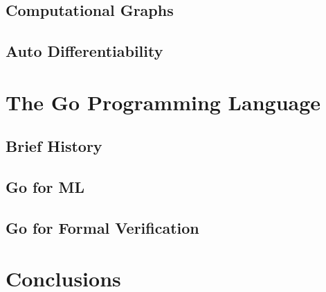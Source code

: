 \subsection{Computational Graphs}
\subsection{Auto Differentiability}

\section{The Go Programming Language}

\subsection{Brief History}
\subsection{Go for ML}
\subsection{Go for Formal Verification}

\section{Conclusions}

